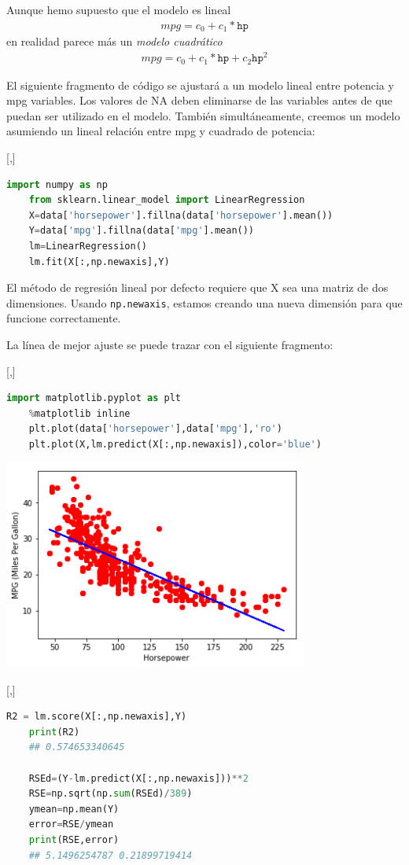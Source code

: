 Aunque hemo supuesto que el modelo es lineal
\begin{align}
	mpg = c_{0} + c_{1}*\texttt{hp}
\end{align}
en realidad parece más un \emph{modelo cuadrático}
\begin{align}
	mpg = c_{0} + c_{1}*\texttt{hp} + c_{2}\texttt{hp}^{2}
\end{align}


El siguiente fragmento de código se ajustará a un modelo lineal entre potencia y mpg
variables. Los valores de NA deben eliminarse de las variables antes de que puedan
ser utilizado en el modelo. También simultáneamente, creemos un modelo asumiendo un lineal
relación entre mpg y cuadrado de potencia:

[,]{}
\begin{lstlisting}[language=Python]
	import numpy as np
	from sklearn.linear_model import LinearRegression
	X=data['horsepower'].fillna(data['horsepower'].mean())
	Y=data['mpg'].fillna(data['mpg'].mean())
	lm=LinearRegression()
	lm.fit(X[:,np.newaxis],Y)
\end{lstlisting}


El método de regresión lineal por defecto requiere que X sea una matriz de dos
dimensiones. Usando \texttt{np.newaxis}, estamos creando una nueva dimensión para que
funcione correctamente.

La línea de mejor ajuste se puede trazar con el siguiente fragmento:

[,]{}
\begin{lstlisting}[language=Python]
	import matplotlib.pyplot as plt
	%matplotlib inline
	plt.plot(data['horsepower'],data['mpg'],'ro')
	plt.plot(X,lm.predict(X[:,np.newaxis]),color='blue')
\end{lstlisting}



\begin{center}
	\includegraphics[width=10cm,keepaspectratio=true]{./images/hpLR.png}
\end{center}
[,]{}
\begin{lstlisting}[language=Python]
	R2 = lm.score(X[:,np.newaxis],Y)
	print(R2)
	## 0.574653340645
	
	RSEd=(Y-lm.predict(X[:,np.newaxis]))**2
	RSE=np.sqrt(np.sum(RSEd)/389)
	ymean=np.mean(Y)
	error=RSE/ymean
	print(RSE,error)
	## 5.1496254787 0.21899719414
\end{lstlisting}


